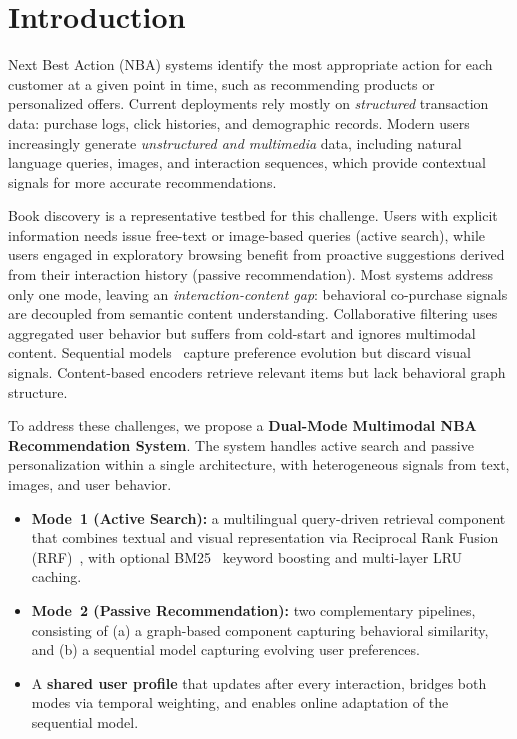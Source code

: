 \section{Introduction}
\label{sec:intro}

Next Best Action (NBA) systems identify the most appropriate action for each
customer at a given point in time, such as recommending products or
personalized offers.
Current deployments rely mostly on \emph{structured} transaction data:
purchase logs, click histories, and demographic records.
Modern users increasingly generate \emph{unstructured and multimedia} data,
including natural language queries, images, and interaction sequences, which
provide contextual signals for more accurate recommendations.

Book discovery is a representative testbed for this challenge.
Users with explicit information needs issue free-text or image-based queries
(active search), while users engaged in exploratory browsing benefit from
proactive suggestions derived from their interaction history (passive recommendation).
Most systems address only one mode, leaving an \emph{interaction-content gap}:
behavioral co-purchase signals are decoupled from semantic content understanding.
Collaborative filtering uses aggregated user behavior but suffers from cold-start
and ignores multimodal content. Sequential models~\cite{kang2018self} capture
preference evolution but discard visual signals. Content-based encoders retrieve
relevant items but lack behavioral graph structure.

To address these challenges, we propose a \textbf{Dual-Mode Multimodal NBA Recommendation System}. The system handles active search and passive personalization within a single architecture, with heterogeneous signals from text, images, and user behavior.
\begin{itemize}
  \item \textbf{Mode~1 (Active Search):}  a multilingual query-driven
        retrieval component that combines textual and visual representation via Reciprocal Rank Fusion (RRF)~\cite{cormack2009rrf}, with optional BM25~\cite{robertson1994okapi} keyword boosting and multi-layer LRU caching.
  \item \textbf{Mode~2 (Passive Recommendation):} two complementary pipelines, consisting of (a) a graph-based component capturing behavioral similarity, and (b) a sequential model capturing evolving user preferences.
  \item A \textbf{shared user profile} that updates after every
        interaction, bridges both modes via temporal weighting, and
        enables online adaptation of the sequential model.
\end{itemize}

